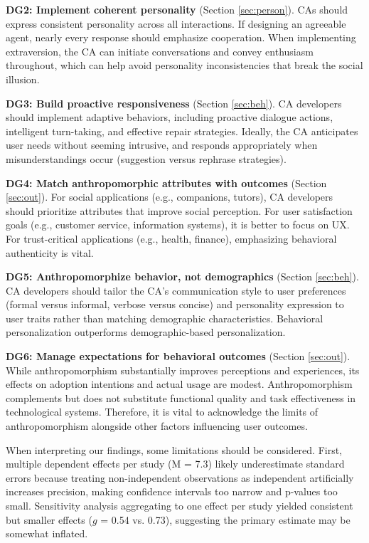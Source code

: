 \documentclass[sigconf,review,anonymous]{acmart}
\begin{document}
\textbf{DG2: Implement coherent personality} (Section \ref{sec:person}). CAs should express consistent personality across all interactions. If designing an agreeable agent, nearly every response should emphasize cooperation. When implementing extraversion, the CA can initiate conversations and convey enthusiasm throughout, which can help avoid personality inconsistencies that break the social illusion.

\textbf{DG3: Build proactive responsiveness} (Section \ref{sec:beh}). CA developers should implement adaptive behaviors, including proactive dialogue actions, intelligent turn-taking, and effective repair strategies. Ideally, the CA anticipates user needs without seeming intrusive, and responds appropriately when misunderstandings occur (suggestion versus rephrase strategies).

\textbf{DG4: Match anthropomorphic attributes with outcomes} (Section \ref{sec:out}). For social applications (e.g., companions, tutors), CA developers should prioritize attributes that improve social perception. For user satisfaction goals (e.g., customer service, information systems), it is better to focus on UX. For trust-critical applications (e.g., health, finance), emphasizing behavioral authenticity is vital.

\textbf{DG5: Anthropomorphize behavior, not demographics} (Section \ref{sec:beh}). CA developers should tailor the CA's communication style to user preferences (formal versus informal, verbose versus concise) and personality expression to user traits rather than matching demographic characteristics. Behavioral personalization outperforms demographic-based personalization.

\textbf{DG6: Manage expectations for behavioral outcomes} (Section \ref{sec:out}). While anthropomorphism substantially improves perceptions and experiences, its effects on adoption intentions and actual usage are modest. Anthropomorphism complements but does not substitute functional quality and task effectiveness in technological systems. Therefore, it is vital to acknowledge the limits of anthropomorphism alongside other factors influencing user outcomes.

When interpreting our findings, some limitations should be considered. First, multiple dependent effects per study (M = 7.3) likely underestimate standard errors because treating non-independent observations as independent artificially increases precision, making confidence intervals too narrow and p-values too small. Sensitivity analysis aggregating to one effect per study yielded consistent but smaller effects ($g$ = 0.54 vs. 0.73), suggesting the primary estimate may be somewhat inflated. 
\end{document}
